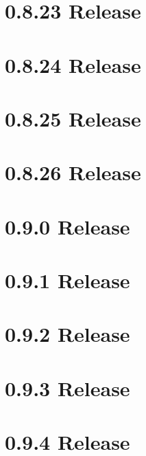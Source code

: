 \let\mypdfximage\pdfximage\def\pdfximage{\immediate\mypdfximage}\documentclass[twoside]{book}
\newcommand{\+}{\discretionary{\mbox{\scriptsize$\hookleftarrow$}}{}{}}
\begin{document}
\chapter{0.8.23 Release}
\label{doc_news_2018-05-13_0_8_23_md}

\chapter{0.8.24 Release}
\label{doc_news_2018-08-18_0_8_24_md}

\chapter{0.8.25 Release}
\label{doc_news_2018-11-18_0_8_25_md}

\chapter{0.8.26 Release}
\label{doc_news_2019-02-26_0_8_26_md}

\chapter{0.9.0 Release}
\label{doc_news_2019-08-06_0_9_0_md}

\chapter{0.9.1 Release}
\label{doc_news_2019-11-26_0_9_1_md}

\chapter{0.9.2 Release}
\label{doc_news_2020-05-26_0_9_2_md}

\chapter{0.9.3 Release}
\label{doc_news_2020-10-30_0_9_3_md}

\chapter{0.9.4 Release}
\label{doc_news_2021-02-01_0_9_4_md}

\end{document}
